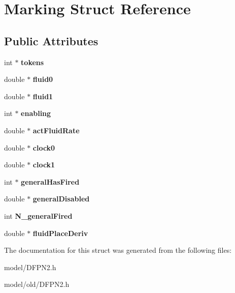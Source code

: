 \hypertarget{structMarking}{\section{Marking Struct Reference}
\label{structMarking}
}
\subsection*{Public Attributes}
\begin{DoxyCompactItemize}
\item 
\hypertarget{structMarking_adac8633ff2b18510a9b5d56228b94d5f}{int $\ast$ {\bfseries tokens}}\label{structMarking_adac8633ff2b18510a9b5d56228b94d5f}

\item 
\hypertarget{structMarking_acc070468276b4cad1f58efa182fa8a28}{double $\ast$ {\bfseries fluid0}}\label{structMarking_acc070468276b4cad1f58efa182fa8a28}

\item 
\hypertarget{structMarking_ada89f6c4febeab6d1307e57e008d3c5e}{double $\ast$ {\bfseries fluid1}}\label{structMarking_ada89f6c4febeab6d1307e57e008d3c5e}

\item 
\hypertarget{structMarking_aa967d1f3b072da5446d6da89ca7292b2}{int $\ast$ {\bfseries enabling}}\label{structMarking_aa967d1f3b072da5446d6da89ca7292b2}

\item 
\hypertarget{structMarking_a72455057a8ef90382dd01c298ccdd574}{double $\ast$ {\bfseries act\-Fluid\-Rate}}\label{structMarking_a72455057a8ef90382dd01c298ccdd574}

\item 
\hypertarget{structMarking_a407049837b4c62a64fa65182b0e6cce6}{double $\ast$ {\bfseries clock0}}\label{structMarking_a407049837b4c62a64fa65182b0e6cce6}

\item 
\hypertarget{structMarking_aff719d38a62c4809deaf4cc2b8632ed1}{double $\ast$ {\bfseries clock1}}\label{structMarking_aff719d38a62c4809deaf4cc2b8632ed1}

\item 
\hypertarget{structMarking_aa701ec8ab5d11fa7cfbc57931135fcc6}{int $\ast$ {\bfseries general\-Has\-Fired}}\label{structMarking_aa701ec8ab5d11fa7cfbc57931135fcc6}

\item 
\hypertarget{structMarking_ad5c88546dc2302b56b3b35882c738e2d}{double $\ast$ {\bfseries general\-Disabled}}\label{structMarking_ad5c88546dc2302b56b3b35882c738e2d}

\item 
\hypertarget{structMarking_a9f3e1a4d50438e41a3489ae532206f2a}{int {\bfseries N\-\_\-general\-Fired}}\label{structMarking_a9f3e1a4d50438e41a3489ae532206f2a}

\item 
\hypertarget{structMarking_ae5438ea9b802d64de9be15c12bd44bc1}{double $\ast$ {\bfseries fluid\-Place\-Deriv}}\label{structMarking_ae5438ea9b802d64de9be15c12bd44bc1}

\end{DoxyCompactItemize}


The documentation for this struct was generated from the following files\-:\begin{DoxyCompactItemize}
\item 
model/D\-F\-P\-N2.\-h\item 
model/old/D\-F\-P\-N2.\-h\end{DoxyCompactItemize}
